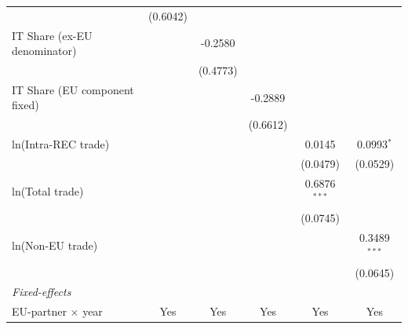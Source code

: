 \begin{tabular}{lccccc}
                                 & (0.6042)       &                                  &                                   &                                    &   \\   
   IT Share (ex-EU denominator)  &                & -0.2580                          &                                   &                                    &   \\   
                                 &                & (0.4773)                         &                                   &                                    &   \\   
   IT Share (EU component fixed) &                &                                  & -0.2889                           &                                    &   \\   
                                 &                &                                  & (0.6612)                          &                                    &   \\   
   ln(Intra-REC trade)           &                &                                  &                                   & 0.0145                             & 0.0993$^{*}$\\   
                                 &                &                                  &                                   & (0.0479)                           & (0.0529)\\   
   ln(Total trade)               &                &                                  &                                   & 0.6876$^{***}$                     &   \\   
                                 &                &                                  &                                   & (0.0745)                           &   \\   
   ln(Non-EU trade)              &                &                                  &                                   &                                    & 0.3489$^{***}$\\   
                                 &                &                                  &                                   &                                    & (0.0645)\\   
   \midrule
   \emph{Fixed-effects}\\
   EU-partner $\times$ year      & Yes            & Yes                              & Yes                               & Yes                                & Yes\\  

\end{tabular}
